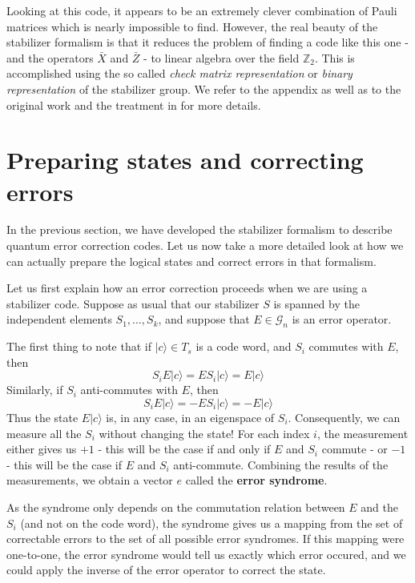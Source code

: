 \documentclass[a4paper, draft]{article}
\theoremstyle{own}
\theoremstyle{remark}
\newcommand{\Z}{\mathbb{Z}}
\begin{document}
Looking at this code, it appears to be an extremely clever combination of Pauli matrices which is nearly impossible to find. However, the real beauty of the stabilizer formalism is that it reduces the problem of finding a code like this one - and the operators $\bar{X}$ and $\bar{Z}$ - to linear algebra over the field $\Z_2$. This is accomplished using the so called \emph{check matrix representation} or \emph{binary representation} of the stabilizer group. We refer to the appendix as well as to the original work \cite{GThesis} and the treatment in \cite{NC} for more details.


\section{Preparing states and correcting errors}

In the previous section, we have developed the stabilizer formalism to describe quantum error correction codes. Let us now take a more detailed look at how we can actually prepare the logical states and correct errors in that formalism.

Let us first explain how an error correction proceeds when we are using a stabilizer code. Suppose as usual that our stabilizer $S$ is spanned by the independent elements $S_1, \dots, S_k$, and suppose that $E \in \mathcal{G}_n$ is an error operator.

The first thing to note that if $|c \rangle \in T_s$ is a code word, and $S_i$ commutes with $E$, then 
$$
S_i E |c \rangle = E S_i |c \rangle = E |c \rangle 
$$
Similarly, if $S_i$ anti-commutes with $E$, then
$$
S_i E |c \rangle = - E S_i |c \rangle = - E |c \rangle 
$$
Thus the state $E |c \rangle$ is, in any case, in an eigenspace of $S_i$. Consequently, we can measure all the $S_i$ without changing the state! For each index $i$, the measurement either gives us $+1$ - this will be the case if and only if $E$ and $S_i$ commute - or $-1$ - this will be the case if $E$ and $S_i$ anti-commute. Combining the results of the measurements, we obtain a vector $e$ called the {\bf error syndrome}.

As the syndrome only depends on the commutation relation between $E$ and the $S_i$ (and not on the code word), the syndrome gives us a mapping from the set of correctable errors to the set of all possible error syndromes. If this mapping were one-to-one, the error syndrome would tell us exactly which error occured, and we could apply the inverse of the error operator to correct the state. 
\end{document}
